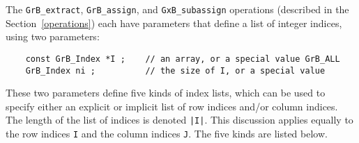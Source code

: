 \documentclass[12pt]{article}
\begin{document}
The \verb'GrB_extract', \verb'GrB_assign', and \verb'GxB_subassign' operations
(described in the Section~\ref{operations}) each have parameters that define a
list of integer indices, using two parameters:

    {\footnotesize
    \begin{verbatim}
    const GrB_Index *I ;    // an array, or a special value GrB_ALL
    GrB_Index ni ;          // the size of I, or a special value \end{verbatim}}

These two parameters define five kinds of index lists, which can be used to
specify either an explicit or implicit list of row indices and/or column
indices.  The length of the list of indices is denoted \verb'|I|'.  This
discussion applies equally to the row indices \verb'I' and the column indices
\verb'J'.  The five kinds are listed below.
\end{document}
